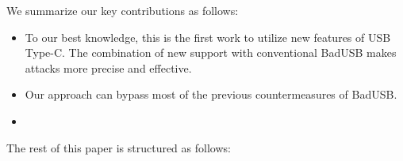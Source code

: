 We summarize our key contributions as follows:
\begin{itemize}
	\item To our best knowledge, this is the first work to utilize new features of USB Type-C.
	The combination of new support with conventional BadUSB makes attacks more precise and effective.
	\item Our approach can bypass most of the previous countermeasures of BadUSB.
	\item {}
\end{itemize}

The rest of this paper is structured as follows:














